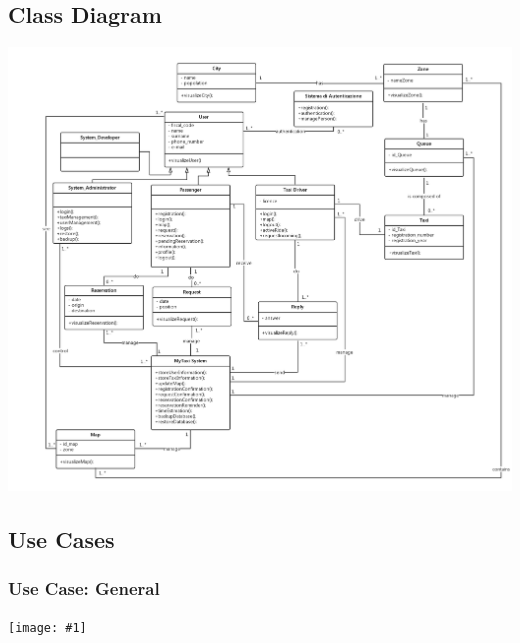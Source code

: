 \documentclass[11pt, a4paper,titlepage]{article}
\newcommand{\image}[1]{
	\begin{center}
		\noindent \texttt{[image: \#1]}
	\end{center}
	}
\begin{document}
\subsection{Class Diagram}
	 \includegraphics[width=\textwidth]{schema_class_diagram.png}
\pagebreak
\subsection{Use Cases}
\subsubsection{Use Case: General}
	\image{usecase_general.png}
\end{document}
